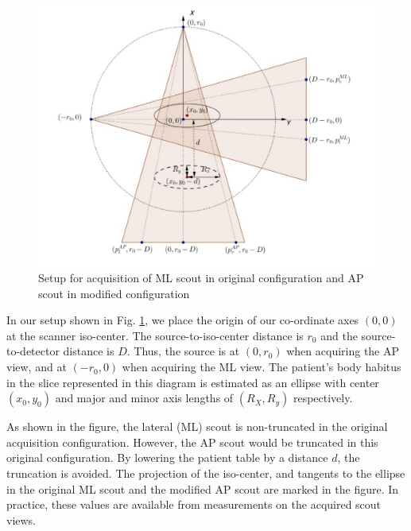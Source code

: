 \documentclass[]{spie}
\begin{document}
%
\begin{figure}[hbtp]
\centering
\includegraphics[width=15 cm]{fig-geometry-algebra}
\caption{Setup for acquisition of ML scout  in original configuration and AP scout in modified configuration \label{fig:scoutIT_geometry}
}
\end{figure}

In our setup shown in Fig. \ref{fig:scoutIT_geometry}, we place the origin of our co-ordinate axes $\left( 0, 0 \right)$ at the scanner iso-center. The source-to-iso-center distance is $r_0$ and the source-to-detector distance is $D$. Thus, the source is at $\left( 0, r_0 \right)$ when acquiring the AP view, and at $\left( -r_0, 0 \right)$ when acquiring the ML view. The patient's body habitus in the slice represented in this diagram is estimated as an ellipse with center $\left( x_0, y_0 \right)$ and major and minor axis lengths of $\left( R_X, R_y \right)$ respectively. 

As shown in the figure, the lateral (ML) scout is non-truncated in the original acquisition configuration. However, the AP scout would be truncated in this original configuration. By lowering the patient table by a distance $d$, the truncation is avoided. The projection of the iso-center, and tangents to the ellipse in the original ML scout and the modified AP scout are marked in the figure. In practice, these values are available from measurements on the acquired scout views. 
\end{document}
